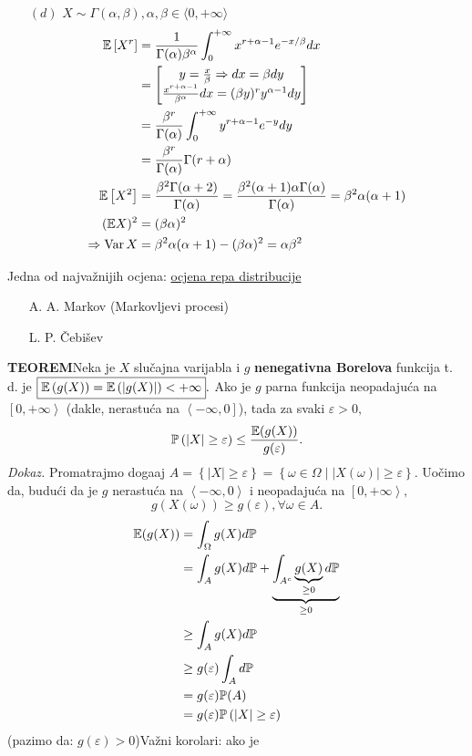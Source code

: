 \documentclass{article}
\newcommand{\Var}{\operatorname{Var}}
\begin{document}
\begin{enumerate}
    \item[\((d)\)] \(X\sim\Gamma(\alpha,\beta),\alpha,\beta\in\langle 0,+\infty\rangle\) \[\begin{aligned}\Bbb E\left[X^r\right]&=\frac1{\Gamma(\alpha)\beta^\alpha}\int_0^{+\infty}x^{r+\alpha-1}e^{-x/\beta}dx\\&=\begin{bmatrix}y=\frac{x}\beta\Rightarrow dx=\beta dy\\\frac{x^{r+\alpha-1}}{\beta^\alpha}dx=(\beta y)^ry^{\alpha-1}dy\end{bmatrix}\\&=\frac{\beta^r}{\Gamma(\alpha)}\int_0^{+\infty}y^{r+\alpha-1}e^{-y}dy\\&=\frac{\beta^r}{\Gamma(\alpha)}\Gamma(r+\alpha)\\\Bbb E\left[X^2\right]&=\frac{\beta^2\Gamma(\alpha+2)}{\Gamma(\alpha)}=\frac{\beta^2(\alpha+1)\alpha\Gamma(\alpha)}{\Gamma(\alpha)}=\beta^2\alpha(\alpha+1)\\(\Bbb EX)^2&=(\beta\alpha)^2\\\Rightarrow\Var X&=\beta^2\alpha(\alpha+1)-(\beta\alpha)^2=\alpha\beta^2\end{aligned}\]
\end{enumerate}
Jedna od najvažnijih ocjena: \underline{ocjena repa distribucije}
\begin{itemize}
    \item[\ding{228}] A. A. Markov (Markovljevi procesi)
    \item[\ding{228}] L. P. Čebišev
\end{itemize}
\textbf{TEOREM}\newline Neka je \(X\) slučajna varijabla i \(g\) \textbf{nenegativna Borelova} funkcija t. d. je \(\boxed{\Bbb E\left(g(X)\right)=\Bbb E\left(\left|g(X)\right|\right)<+\infty}.\) Ako je \(g\) parna funkcija neopadajuća na \(\left[0,+\infty\right\rangle\) (dakle, nerastuća na \(\left\langle-\infty,0\right]\)), tada za svaki \(\varepsilon>0,\) \[\Bbb P\left(|X|\ge\varepsilon\right)\le\frac{\Bbb E(g(X))}{g(\varepsilon)}.\] 
\textit{Dokaz.}\newline
Promatrajmo doga\dj{}aj \(A=\left\{|X|\ge\varepsilon\right\}=\left\{\omega\in\Omega\mid |X(\omega)|\ge\varepsilon\right\}.\) Uočimo da, budući da je \(g\) nerastuća na \(\left\langle-\infty,0\right\rangle\) i neopadajuća na \(\left[0,+\infty\right\rangle,\) \[g(X(\omega))\ge g(\varepsilon),\forall\omega\in A.\] \[\begin{aligned}\Bbb E(g(X))&=\int_\Omega g(X)d\Bbb P\\&=\int_Ag(X)d\Bbb P+\underbrace{\int_{A^c}\underbrace{g(X)}_{\ge 0}d\Bbb P}_{\ge 0}\\&\ge\int_Ag(X)d\Bbb P\\&\ge g(\varepsilon)\int_Ad\Bbb P\\&=g(\varepsilon)\Bbb P(A)\\&=g(\varepsilon)\Bbb P\left(|X|\ge\varepsilon\right)\end{aligned}\] (pazimo da: \(g(\varepsilon)>0\))\newline\newline Važni korolari: ako je 
\end{document}
